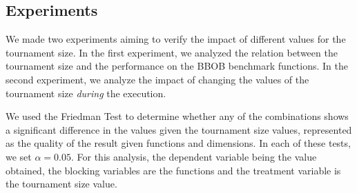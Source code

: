 %
%
%
%
%



\label{sec:experiment}

\subsection{Experiments}
We made two experiments aiming to verify the impact of different values for the tournament size. In the first experiment, we analyzed the relation between the tournament size and the performance on the BBOB benchmark functions. In the second experiment, we analyze the impact of changing the values of the tournament size \textit{during} the execution.

We used the Friedman Test to determine whether any of the combinations shows a
significant difference in the values given the tournament size values, represented as the
quality of the result given functions and dimensions. In each of these tests, we set
$\alpha = 0.05$. For this analysis, the dependent variable being the value obtained, the blocking variables are the functions and the treatment variable is the tournament size value.

